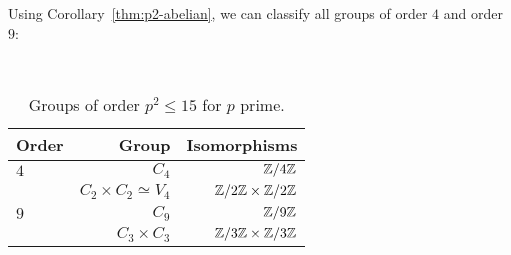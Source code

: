 Using Corollary~\ref{thm:p2-abelian}, we can classify all groups of order
$4$ and order $9$:

\begin{center}
  \begin{table}[H]~\label{tab:groups-order-p_2}
    \begin{tabular}{ l r r }
      Order & Group & Isomorphisms \\
      \midrule
      $4$ & $C_4$ & $\mathbb{Z}/4\mathbb{Z}$ \\
          & $C_2 \times C_2 \simeq V_4$ & $\mathbb{Z}/2\mathbb{Z} \times \mathbb{Z}/2\mathbb{Z}$ \\
      \midrule
      $9$ & $C_9$ & $\mathbb{Z}/9\mathbb{Z}$ \\
          & $C_3 \times C_3$ & $\mathbb{Z}/3\mathbb{Z} \times \mathbb{Z}/3\mathbb{Z}$ \\
      \bottomrule
    \end{tabular}
    \caption{Groups of order $p^2 \le 15$ for $p$ prime.}
  \end{table}
\end{center}
